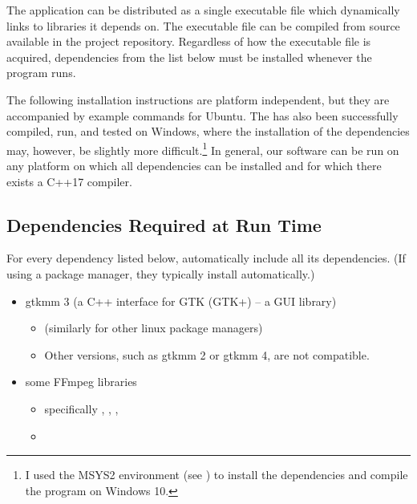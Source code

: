 \documentclass[11pt,a4paper,twoside,openright]{report}
\begin{document}
The application can be distributed as a single executable file which dynamically links to libraries it depends on. The executable file can be compiled from source available in the project repository. Regardless of how the executable file is acquired, dependencies from the list below must be installed whenever the program runs.

The following installation instructions are platform independent, but they are accompanied by example commands for Ubuntu. The \software{} has also been successfully compiled, run, and tested on Windows, where the installation of the dependencies may, however, be slightly more difficult.\footnote{I used the MSYS2 environment (see \cite{msys2}) to install the dependencies and compile the program on Windows 10.} In general, our software can be run on any platform on which all dependencies can be installed and for which there exists a C++17 compiler.

\subsection{Dependencies Required at Run Time}\label{sec:runtimedeps}
For every dependency listed below, automatically include all its dependencies. (If using a package manager, they typically install automatically.)
\begin{itemize}
	\item gtkmm 3 (a C++ interface for GTK (GTK+) -- a GUI library)
		\begin{itemize}
			\item \pubinst{} (similarly for other linux package mana\-gers)
			\item Other versions, such as gtkmm 2 or gtkmm 4, are not compatible.
		\end{itemize}
	\item some FFmpeg libraries
		\begin{itemize}
			\item specifically , , , 
			\item \pubinst
		\end{itemize}
\end{itemize}
\end{document}
